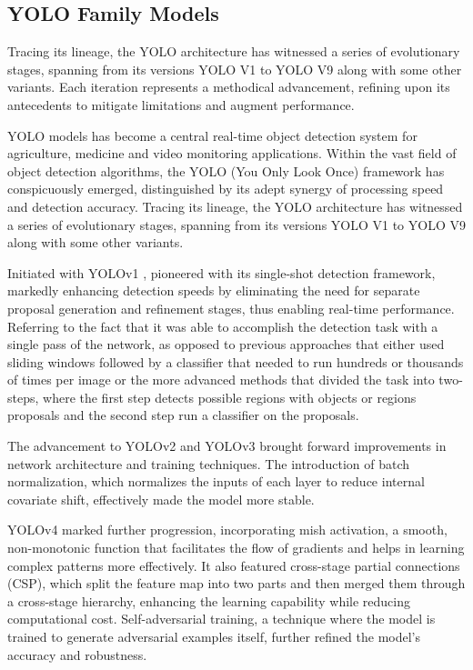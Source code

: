 \subsection{YOLO Family Models}



Tracing its lineage, the YOLO architecture has witnessed a series of evolutionary stages, spanning from its versions YOLO V1 to YOLO V9 along with some other variants. Each iteration represents a methodical advancement, refining upon its antecedents to mitigate limitations and augment performance. 


YOLO models has become a central real-time object detection system for agriculture, medicine and video monitoring applications. Within the vast field of object detection algorithms, the YOLO (You Only Look Once) framework has conspicuously emerged, distinguished by its adept synergy of processing speed and detection accuracy. Tracing its lineage, the YOLO architecture has witnessed a series of evolutionary stages, spanning from its versions YOLO V1 to YOLO V9 along with some other variants.

Initiated with YOLOv1 \cite{redmon2016you}, pioneered with its single-shot detection framework, markedly enhancing detection speeds by eliminating the need for separate proposal generation and refinement stages, thus enabling real-time performance. Referring to the fact that it was able to accomplish the detection task with a single pass of the network, as opposed to previous approaches that either used sliding windows followed by a classifier that needed to run hundreds or thousands of times per image or the more advanced methods that divided the task into two-steps, where the first step detects possible regions with objects or regions proposals and the second step run a classifier on the proposals.


The advancement to YOLOv2 \cite{redmon2017yolo9000} and YOLOv3 \cite{redmon2018yolov3} brought forward improvements in network architecture and training techniques. The introduction of batch normalization, which normalizes the inputs of each layer to reduce internal covariate shift, effectively made the model more stable. 

YOLOv4 \cite{bochkovskiy2020yolov4} marked further progression, incorporating mish activation, a smooth, non-monotonic function that facilitates the flow of gradients and helps in learning complex patterns more effectively. It also featured cross-stage partial connections (CSP), which split the feature map into two parts and then merged them through a cross-stage hierarchy, enhancing the learning capability while reducing computational cost. Self-adversarial training, a technique where the model is trained to generate adversarial examples itself, further refined the model's accuracy and robustness.

